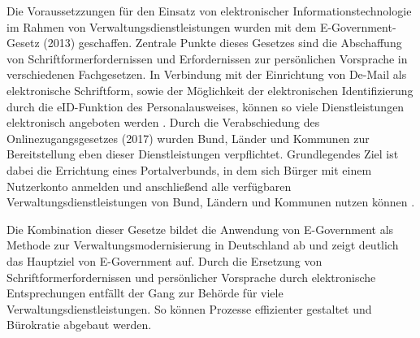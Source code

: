 Die Voraussetzzungen für den Einsatz von elektronischer Informationstechnologie im Rahmen von Verwaltungsdienstleistungen wurden mit dem E-Government-Gesetz (2013) geschaffen.
Zentrale Punkte dieses Gesetzes sind die Abschaffung von Schriftformerfordernissen und Erfordernissen zur persönlichen Vorsprache in verschiedenen Fachgesetzen.
In Verbindung mit der Einrichtung von De-Mail als elektronische Schriftform, sowie der Möglichkeit der elektronischen Identifizierung durch die eID-Funktion des Personalausweises, können so viele Dienstleistungen elektronisch angeboten werden \citep[][]{BMI2023}.
Durch die Verabschiedung des Onlinezugangsgesetzes (2017) wurden Bund, Länder und Kommunen zur Bereitstellung eben dieser Dienstleistungen verpflichtet.
Grundlegendes Ziel ist dabei die Errichtung eines Portalverbunds, in dem sich Bürger mit einem Nutzerkonto anmelden und anschließend alle verfügbaren Verwaltungsdienstleistungen von Bund, Ländern und Kommunen nutzen können \citep[][]{Martini2019}.

Die Kombination dieser Gesetze bildet die Anwendung von E-Government als Methode zur Verwaltungsmodernisierung in Deutschland ab und zeigt deutlich das Hauptziel von E-Government auf.
Durch die Ersetzung von Schriftformerfordernissen und persönlicher Vorsprache durch elektronische Entsprechungen entfällt der Gang zur Behörde für viele Verwaltungsdienstleistungen.
So können Prozesse effizienter gestaltet und Bürokratie abgebaut werden.
